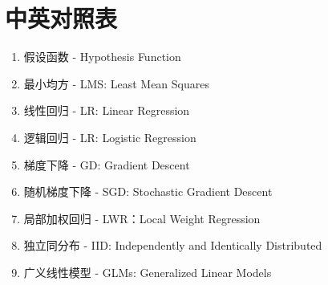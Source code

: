 \section{中英对照表}
\begin{enumerate}
	\item 假设函数 - Hypothesis Function
	\item 最小均方 - LMS: Least Mean Squares
	\item 线性回归 - LR: Linear Regression
	\item 逻辑回归 - LR: Logistic Regression
	\item 梯度下降 - GD: Gradient Descent
	\item 随机梯度下降 - SGD: Stochastic Gradient Descent
	\item 局部加权回归 - LWR：Local Weight Regression
	\item 独立同分布 - IID: Independently and Identically Distributed
	\item 广义线性模型 - GLMs: Generalized Linear Models
\end{enumerate}